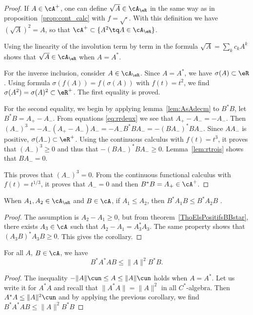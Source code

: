\begin{proof}
	If $A\in\cA^+$, one can define $\sqrt{A}\in\cA_{\eR}$ in the same way as in proposition~\ref{prop:cont_calc} with $f=\sqrt{\cdot}$. With this definition we have $(\sqrt{A})^2=A$, so that $\cA^+\subset\{ A^2\tq A\in\cA_{\eR} \}$.

	Using the linearity of the involution term by term in the formula $\sqrt{A}=\sum_k c_kA^k$ shows that $\sqrt{A}\in\cA_{\eR}$ when $A=A^*$.

	For the inverse inclusion, consider $A\in\cA_{\eR}$. Since $A=A^*$, we have $\sigma(A)\subset\eR$. Using formula $\sigma(f(A))=f(\sigma(A))$ with $f(t)=t^2$, we find $\sigma(A^2)=\sigma(A)^2\subset\eR^+$. The first equality is proved.

	For the second equality, we begin by applying lemma~\ref{lem:AsAdecm} to $B^*B$, let $B^*B=A_+-A_-$. From equations \eqref{eq:rrdeux} we see that $A_+-A_-=-A_-$. Then $(A_-)^3=-A_-(A_+-A_-)A_-=-A_-B^*BA_-=-(BA_-)^*BA_-$. Since $AA_-$ is positive, $\sigma(A_-)\subset\eR^+$. Using the continuous calculus with $f(t)=t^3$, it proves that $(A_-)^3\geq 0$ and thus that $-(BA_-)^*BA_-\geq 0$. Lemma~\ref{lem:rtrois} shows that $BA_-=0$.

	This proves that $(A_-)^3=0$. From the continuous functional calculus with $f(t)=t^{1/3}$, it proves that $A_-=0$ and then $B^*B=A_+\in\cA^+$.
\end{proof}
\begin{corollary}
	When $A_1,A_2\in\cA_{\eR}$ and $B\in\cA$, if $A_1\leq A_2$, then $B^*A_1B\leq B^*A_2B$ .
\end{corollary}

\begin{proof}
	The assumption is $A_2-A_1\geq 0$, but from theorem~\ref{ThoElsPositifsBBstar}, there exists $A_3\in\cA$ such that $A_2-A_1=A^*_3A_3$. The same property shows that $(A_3B)^*A_3B\geq 0$. This gives the corollary.
\end{proof}


\begin{corollary}
	For all $A$, $B\in\cA$, we have
	\[
		B^*A^*AB\leq \| A \|^2B^*B.
	\]
	\label{cor:BeAAeB}
\end{corollary}

\begin{proof}
	The inequality $-\| A \|\cun\leq A\leq \| A \|\cun$ holds when $A=A^*$. Let us write it for $A^*A$ and recall that $\| A^*A \|=\| A \|^2$ in all $C^*$-algebra. Then $A^*A\leq \| A \|^2\cun$ and by applying the previous corollary, we find $B^*A^*AB\leq\| A \|^2B^*B$
\end{proof}



